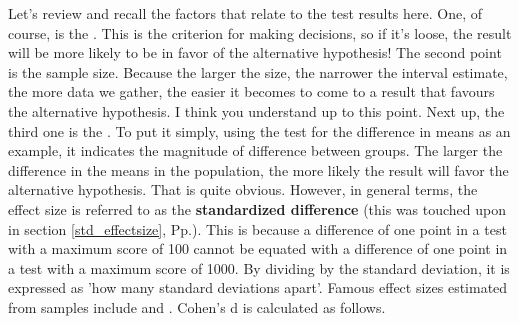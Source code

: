 \documentclass{ltjsbook}
\begin{document}
Let's review and recall the factors that relate to the test results here. One, of course, is the . This is the criterion for making decisions, so if it's loose, the result will be more likely to be in favor of the alternative hypothesis!
The second point is the sample size. Because the larger the size, the narrower the interval estimate, the more data we gather, the easier it becomes to come to a result that favours the alternative hypothesis. I think you understand up to this point.
Next up, the third one is the . To put it simply, using the test for the difference in means as an example, it indicates the magnitude of difference between groups. The larger the difference in the means in the population, the more likely the result will favor the alternative hypothesis. That is quite obvious. However, in general terms, the effect size is referred to as the \textbf{standardized difference} (this was touched upon in section \ref{std_effectsize}, Pp.\pageref{std_effectsize}). This is because a difference of one point in a test with a maximum score of 100 cannot be equated with a difference of one point in a test with a maximum score of 1000. By dividing by the standard deviation, it is expressed as 'how many standard deviations apart'. Famous effect sizes estimated from samples include  and . Cohen's d is calculated as follows.
\end{document}
